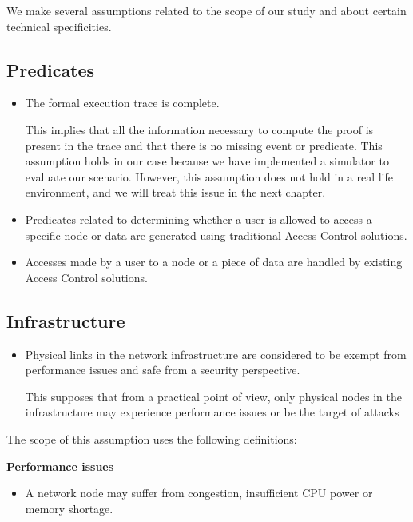 We make several assumptions related to the scope of our study and about certain technical specificities.

\subsection{Predicates}

\begin{itemize}
    \item The formal execution trace is complete.
    
    This implies that all the information necessary to compute the proof is present in the trace and that there is no missing event or predicate.
This assumption holds in our case because we have implemented a simulator to evaluate our scenario. However, this assumption does not hold in a real life environment, and we will treat this issue in the next chapter.

    \item Predicates related to determining whether a user is allowed to access a specific node or data are generated using traditional Access Control solutions.
    
    \item Accesses made by a user to a node or a piece of data are handled by existing Access Control solutions.
    
\end{itemize}


\subsection{Infrastructure}
\begin{itemize}
    \item Physical links in the network infrastructure are considered to be exempt from performance issues and safe from a security perspective.
    
    This supposes that from a practical point of view, only physical nodes in the infrastructure may experience performance issues or be the target of attacks
\end{itemize}

\newpage
The scope of this assumption uses the following definitions:

\textbf{Performance issues} 
\begin{itemize}
    \item A network node may suffer from congestion, insufficient CPU power or memory shortage. 
\end{itemize} 

